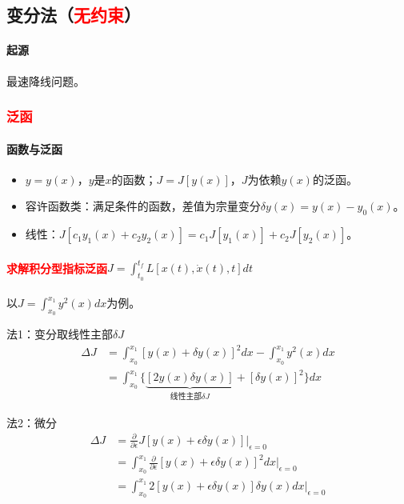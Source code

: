 \documentclass[
12pt, %
a4paper, 
oneside, %
]{scrartcl}
\begin{document}
\subsection[变分法]{变分法（\textcolor{red}{无约束}）}
\paragraph{起源}
最速降线问题。
\subsubsection[泛函]{\textcolor{red}{泛函}}
\paragraph{函数与泛函}
\begin{itemize}
\item $ y = y(x) $，$ y $是$ x $的函数；$ J = J[y(x)] $，$ J $为依赖$ y(x) $的泛函。
\item 容许函数类：满足条件的函数，差值为宗量变分$ \delta y(x) = y(x) - y_0(x) $。
\item 线性：$ J[c_1 y_1(x) + c_2 y_2(x)] = c_1 J[y_1(x)] + c_2 J[y_2(x)] $。
\end{itemize}
\paragraph{\textcolor{red}{求解积分型指标泛函}$ J = \int_{t_0}^{t_f} L[x(t), \dot{x}(t), t] d t $}
以$ J = \int_{x_0}^{x_1} y^2(x) d x $为例。
\begin{itemize}
\begin{minipage}{0.5\textwidth}
\item 法1：变分取线性主部$ \delta J $
\begin{align*} \Delta J &= \int_{x_0}^{x_1} [y(x) + \delta y(x)]^2 d x - \int_{x_0}^{x_1} y^2(x) d x \\ &= \int_{x_0}^{x_1} \{\underbrace{[2y(x) \delta y(x)]}_{\text{线性主部}\delta J} + [\delta y(x)]^2\} d x \end{align*}
\end{minipage}
\begin{minipage}{0.5\textwidth}
\item 法2：微分
\begin{align*} 
\Delta J &= \frac{\partial}{\partial \epsilon} J[y(x) + \epsilon \delta y(x)]|_{\epsilon = 0} \\
&= \int_{x_0}^{x_1} \frac{\partial}{\partial \epsilon}[y(x) + \epsilon \delta y(x)]^2 d x|_{\epsilon = 0} \\
&= \int_{x_0}^{x_1} 2[y(x) + \epsilon \delta y(x)] \delta y(x) d x|_{\epsilon = 0}
\end{align*}
\end{minipage}
\end{itemize}
\end{document}
